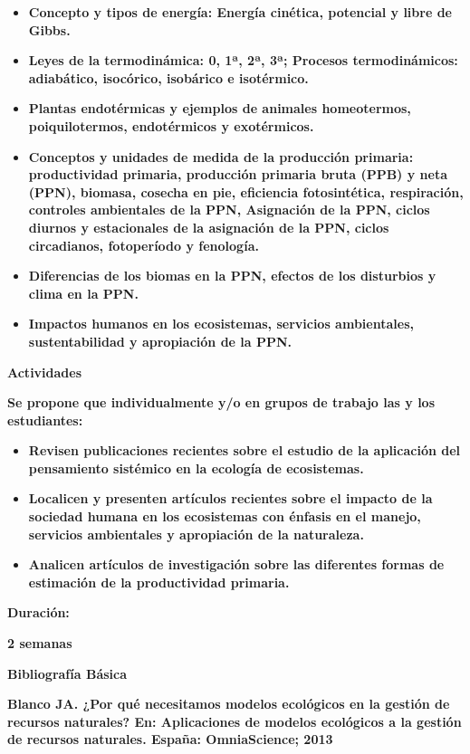 \documentclass[
]{article}
\begin{document}
\begin{itemize}
\item
  \textbf{Concepto y tipos de energía: Energía cinética, potencial y
  libre de Gibbs.}
\item
  \textbf{Leyes de la termodinámica: 0, 1ª, 2ª, 3ª; Procesos
  termodinámicos: adiabático, isocórico, isobárico e isotérmico.}
\item
  \textbf{Plantas endotérmicas y ejemplos de animales homeotermos,
  poiquilotermos, endotérmicos y exotérmicos.}
\item
  \textbf{Conceptos y unidades de medida de la producción primaria:
  productividad primaria, producción primaria bruta (PPB) y neta (PPN),
  biomasa, cosecha en pie, eficiencia fotosintética, respiración,
  controles ambientales de la PPN, Asignación de la PPN, ciclos diurnos
  y estacionales de la asignación de la PPN, ciclos circadianos,
  fotoperíodo y fenología.}
\item
  \textbf{Diferencias de los biomas en la PPN, efectos de los disturbios
  y clima en la PPN.}
\item
  \textbf{Impactos humanos en los ecosistemas, servicios ambientales,
  sustentabilidad y apropiación de la PPN.}
\end{itemize}

\textbf{Actividades}

\textbf{Se propone que individualmente y/o en grupos de trabajo las y
los estudiantes:}

\begin{itemize}
\item
  \textbf{Revisen publicaciones recientes sobre el estudio de la
  aplicación del pensamiento sistémico en la ecología de ecosistemas.}
\item
  \textbf{Localicen y presenten artículos recientes sobre el impacto de
  la sociedad humana en los ecosistemas con énfasis en el manejo,
  servicios ambientales y apropiación de la naturaleza.}
\item
  \textbf{Analicen artículos de investigación sobre las diferentes
  formas de estimación de la productividad primaria.}
\end{itemize}

\textbf{Duración:}

\textbf{2 semanas}

\textbf{Bibliografía Básica}

\textbf{Blanco JA. ¿Por qué necesitamos modelos ecológicos en la gestión
de recursos naturales? En: Aplicaciones de modelos ecológicos a la
gestión de recursos naturales. España: OmniaScience; 2013}
\end{document}
